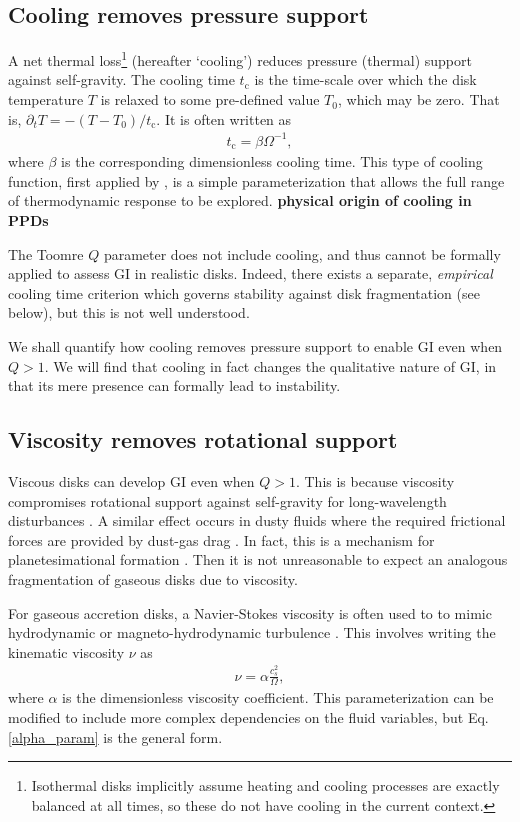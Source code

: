 \documentclass[iop, numberedappendix]{emulateapj}
\newcommand{\p}{\partial}
\newcommand{\tcool}{t_\mathrm{c}}
\begin{document}
\subsection{Cooling removes pressure support}
A net thermal loss\footnote{Isothermal disks implicitly assume 
  heating and cooling processes are exactly balanced at all
  times, so these do not have cooling in the current context.} (hereafter `cooling')
reduces pressure (thermal) support against self-gravity. The cooling time 
$\tcool$ is the time-scale over which the disk temperature $T$ is relaxed
to some pre-defined value $T_0$, which may be zero. That is, $\p_t T =
-(T-T_0)/\tcool$. It is often written as 
\begin{align} 
  \tcool = \beta \Omega^{-1},
\end{align}
where $\beta$ is the corresponding dimensionless cooling time. This
type of cooling function, first applied by \cite{gammie01}, is a
simple parameterization that allows the full range of thermodynamic
response to be explored. 
{\bf physical origin of cooling in PPDs}

The Toomre $Q$ parameter does not include cooling, and thus cannot be
formally applied to assess GI in realistic disks. Indeed, there exists
a separate, \emph{empirical} cooling time criterion which governs
stability against disk fragmentation (see below), but this is not well
understood.     

We shall quantify how cooling removes pressure
support to enable GI even when $Q>1$. 
We will find that cooling in fact changes the 
qualitative nature of GI, in that its mere presence can
formally lead to instability.  

\subsection{Viscosity removes rotational support}
Viscous disks can develop GI even when $Q>1$. This is because
viscosity compromises rotational support against self-gravity for
long-wavelength disturbances
\citep{lynden-bell74,willerding92,gammie96}. A similar effect  
occurs in dusty fluids where the required frictional forces are 
provided by dust-gas drag \citep{ward00, takahashi14}. In fact, this
is a mechanism for planetesimational formation %
\citep{youdin11}. Then it is not unreasonable to expect an analogous
fragmentation of gaseous disks due to viscosity.   

For gaseous accretion disks, a Navier-Stokes viscosity is often used to 
to mimic hydrodynamic or magneto-hydrodynamic turbulence
\citep{shakura73}. This involves writing the
kinematic viscosity $\nu$ as  
\begin{align}\label{alpha_param}
  \nu  = \alpha \frac{c_s^2}{\Omega}, %
\end{align}
where $\alpha$ is the dimensionless viscosity
coefficient. This
parameterization can be modified to include more complex dependencies on the
fluid variables, but Eq. \ref{alpha_param} is the general form. 
\end{document}
